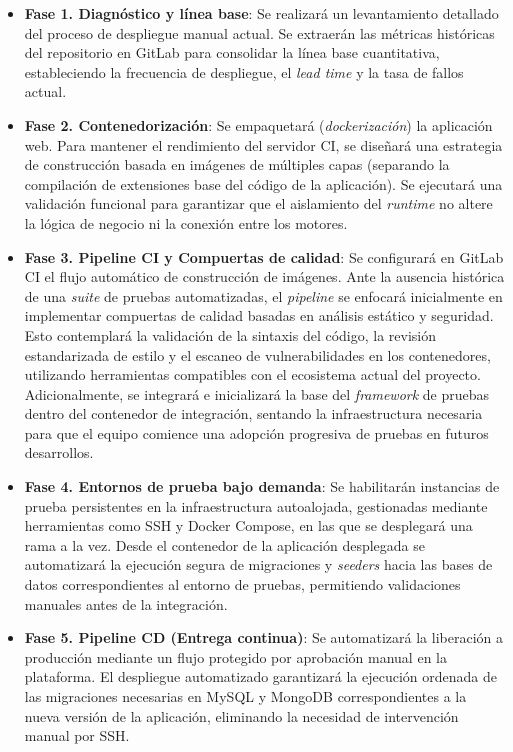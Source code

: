 \begin{itemize}
  \item \textbf{Fase 1. Diagnóstico y línea base}: Se realizará un levantamiento detallado del
  proceso de despliegue manual actual. Se extraerán las métricas históricas del repositorio en
  GitLab para consolidar la línea base cuantitativa, estableciendo la frecuencia de despliegue,
  el \emph{lead time} y la tasa de fallos actual.

  \item \textbf{Fase 2. Contenedorización}: Se empaquetará (\emph{dockerización}) la aplicación
  web. Para mantener el rendimiento del servidor CI, se diseñará una estrategia de construcción
  basada en imágenes de múltiples capas (separando la compilación de extensiones base del código
  de la aplicación). Se ejecutará una validación funcional para garantizar que el aislamiento
  del \emph{runtime} no altere la lógica de negocio ni la conexión entre los motores.

  \item \textbf{Fase 3. Pipeline CI y Compuertas de calidad}: Se configurará en GitLab CI el flujo
  automático de construcción de imágenes. Ante la ausencia histórica de una \emph{suite} de pruebas
  automatizadas, el \emph{pipeline} se enfocará inicialmente en implementar compuertas de calidad
  basadas en análisis estático y seguridad. Esto contemplará la validación de la sintaxis del código,
  la revisión estandarizada de estilo y el escaneo de vulnerabilidades en los contenedores,
  utilizando herramientas compatibles con el ecosistema actual del proyecto.
  Adicionalmente, se integrará e inicializará la base del \emph{framework} de pruebas dentro
  del contenedor de integración, sentando la infraestructura necesaria para que el equipo comience una
  adopción progresiva de pruebas en futuros desarrollos.

  \item \textbf{Fase 4. Entornos de prueba bajo demanda}: Se habilitarán instancias de prueba persistentes en la infraestructura
  autoalojada, gestionadas mediante herramientas como SSH y Docker Compose, en las que se desplegará una rama a la vez.
  Desde el contenedor de la aplicación desplegada se automatizará la ejecución
  segura de migraciones y \emph{seeders} hacia las bases de datos correspondientes al entorno
  de pruebas, permitiendo validaciones manuales antes de la integración.

  \item \textbf{Fase 5. Pipeline CD (Entrega continua)}: Se automatizará la liberación a
  producción mediante un flujo protegido por aprobación manual en la plataforma.
  El despliegue automatizado garantizará la ejecución ordenada de las migraciones necesarias en
  MySQL y MongoDB correspondientes a la nueva versión de la aplicación, eliminando la necesidad
  de intervención manual por SSH.


\end{itemize}
